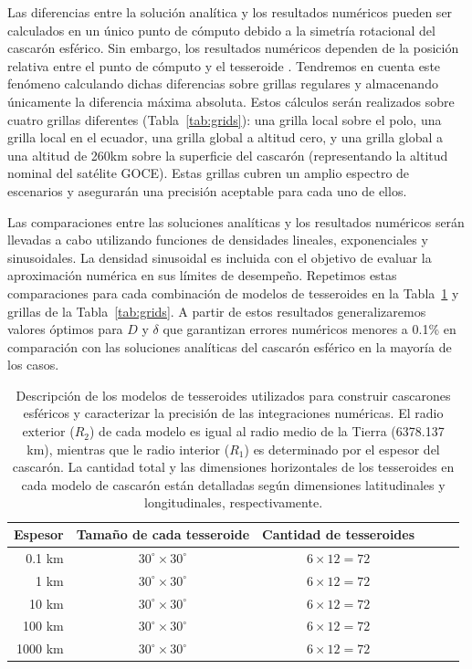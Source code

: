 Las diferencias entre la solución analítica y los resultados numéricos pueden
ser calculados en un único punto de cómputo debido a la simetría rotacional del
cascarón esférico.
Sin embargo, los resultados numéricos dependen de la posición relativa entre el
punto de cómputo y el tesseroide \citep{ku1977, asgharzadeh2007, uieda2016}.
Tendremos en cuenta este fenómeno calculando dichas diferencias sobre grillas
regulares y almacenando únicamente la diferencia máxima absoluta.
Estos cálculos serán realizados sobre cuatro grillas diferentes
(Tabla~\ref{tab:grids}):
una grilla local sobre el polo, una grilla local en el ecuador, una grilla
global a altitud cero, y una grilla global a una altitud de 260km sobre la
superficie del cascarón (representando la altitud nominal del satélite GOCE).
Estas grillas cubren un amplio espectro de escenarios y asegurarán una
precisión aceptable para cada uno de ellos.

Las comparaciones entre las soluciones analíticas y los resultados numéricos
serán llevadas a cabo utilizando funciones de densidades lineales,
exponenciales y sinusoidales.
La densidad sinusoidal es incluida con el objetivo de evaluar la aproximación
numérica en sus límites de desempeño.
Repetimos estas comparaciones para cada combinación de modelos de tesseroides
en la Tabla~\ref{tab:shell-models} y grillas de la Tabla~\ref{tab:grids}.
A partir de estos resultados generalizaremos valores óptimos para $D$
y $\delta$ que garantizan errores numéricos menores a 0.1\% en comparación con
las soluciones analíticas del cascarón esférico en la mayoría de los casos.

\begin{table}
\caption{
    Descripción de los modelos de tesseroides utilizados para construir
    cascarones esféricos y caracterizar la precisión de las integraciones
    numéricas.
    El radio exterior ($R_2$) de cada modelo es igual al radio medio de la
    Tierra (6378.137 km), mientras que le radio interior ($R_1$) es determinado
    por el espesor del cascarón.
    La cantidad total y las dimensiones horizontales de los tesseroides en cada
    modelo de cascarón están detalladas según dimensiones latitudinales
    y longitudinales, respectivamente.
    \newline
}
\label{tab:shell-models}
\centering
\begin{tabular}{rccccc}
    Espesor & Tamaño de cada tesseroide  & Cantidad de tesseroides \\ \hline
    0.1 km  & $30^\circ \times 30^\circ$ & $6 \times 12 = 72$ \\
    1 km    & $30^\circ \times 30^\circ$ & $6 \times 12 = 72$ \\
    10 km   & $30^\circ \times 30^\circ$ & $6 \times 12 = 72$ \\
    100 km  & $30^\circ \times 30^\circ$ & $6 \times 12 = 72$ \\
    1000 km & $30^\circ \times 30^\circ$ & $6 \times 12 = 72$ \\
\end{tabular}
\end{table}

